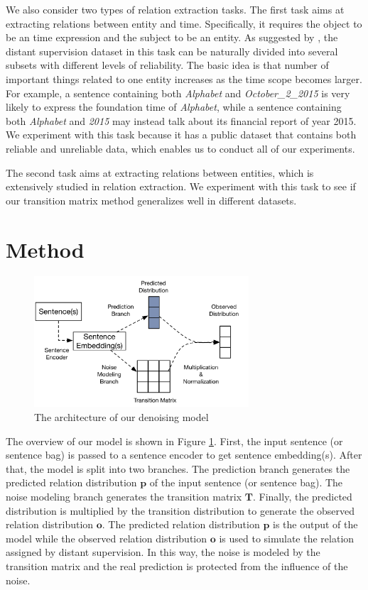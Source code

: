 \documentclass[11pt,a4paper]{article}
\begin{document}
We also consider two types of relation extraction tasks. The first task aims at extracting relations between entity and time. Specifically, it requires the object to be an time expression and the subject to be an entity. As suggested by \cite{luo2016temporal}, the distant supervision dataset in this task can be naturally divided into several subsets with different levels of reliability. The basic idea is that number of important things related to one entity increases as the time scope becomes larger. For example, a sentence containing both \emph{Alphabet} and \emph{October\_2\_2015} is very likely to express the foundation time of \emph{Alphabet}, while a sentence containing both \emph{Alphabet} and \emph{2015} may instead talk about its financial report of year 2015. We experiment with this task because it has a public dataset that contains both reliable and unreliable data, which enables us to conduct all of our experiments.

The second task aims at extracting relations between entities, which is extensively studied in relation extraction. We experiment with this task to see if our transition matrix method generalizes well in different datasets.


\section{Method}

\begin{figure}[htbp]
\begin{center}
\includegraphics[width=8cm]{denoise_framework.png}	
\caption{The architecture of our denoising model}
\label{fig: denoise_framework}
\end{center}
\end{figure}

The overview of our model is shown in Figure \ref{fig: denoise_framework}. First, the input sentence (or sentence bag) is passed to a sentence encoder to get sentence embedding(s). After that, the model is split into two branches. The prediction branch generates the predicted relation distribution $\mathbf{p}$ of the input sentence (or sentence bag). The noise modeling branch generates the transition matrix $\mathbf{T}$. Finally, the predicted distribution is multiplied by the transition distribution to generate the observed relation distribution $\mathbf{o}$. The predicted relation distribution $\mathbf{p}$ is the output of the model while the observed relation distribution $\mathbf{o}$ is used to simulate the relation assigned by distant supervision. In this way, the noise is modeled by the transition matrix and the real prediction is protected from the influence of the noise.
\end{document}

